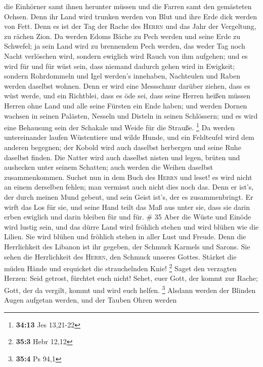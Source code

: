 die Einhörner samt ihnen herunter müssen und die Farren samt den
gemästeten Ochsen. Denn ihr Land wird trunken werden von Blut und ihre
Erde dick werden von Fett.  Denn es ist der Tag der Rache
des \textsc{Herrn} und das Jahr der Vergeltung, zu rächen Zion.
 Da werden Edoms Bäche zu Pech werden und seine Erde zu
Schwefel; ja sein Land wird zu brennendem Pech werden, 
das weder Tag noch Nacht verlöschen wird, sondern ewiglich wird Rauch
von ihm aufgehen; und es wird für und für wüst sein, dass niemand
dadurch gehen wird in Ewigkeit;  sondern Rohrdommeln und
Igel werden's innehaben, Nachteulen und Raben werden daselbst wohnen.
Denn er wird eine Messschnur darüber ziehen, dass es wüst werde, und ein
Richtblei, dass es öde sei,  dass seine Herren heißen
müssen Herren ohne Land und alle seine Fürsten ein Ende haben;
 und werden Dornen wachsen in seinen Palästen, Nesseln
und Disteln in seinen Schlössern; und es wird eine Behausung sein der
Schakale und Weide für die Strauße. \footnote{\textbf{34:13} Jes
  13,21-22}  Da werden untereinander laufen Wüstentiere
und wilde Hunde, und ein Feldteufel wird dem anderen begegnen; der
Kobold wird auch daselbst herbergen und seine Ruhe daselbst finden.
 Die Natter wird auch daselbst nisten und legen, brüten
und aushecken unter seinem Schatten; auch werden die Weihen daselbst
zusammenkommen.  Suchet nun in dem Buch des
\textsc{Herrn} und leset! es wird nicht an einem derselben fehlen; man
vermisst auch nicht dies noch das. Denn er ist's, der durch meinen Mund
gebeut, und sein Geist ist's, der es zusammenbringt.  Er
wirft das Los für sie, und seine Hand teilt das Maß aus unter sie, dass
sie darin erben ewiglich und darin bleiben für und für. \# 35
 Aber die Wüste und Einöde wird lustig sein, und das dürre
Land wird fröhlich stehen und wird blühen wie die Lilien. 
Sie wird blühen und fröhlich stehen in aller Lust und Freude. Denn die
Herrlichkeit des Libanon ist ihr gegeben, der Schmuck Karmels und
Sarons. Sie sehen die Herrlichkeit des \textsc{Herrn}, den Schmuck
unseres Gottes.  Stärket die müden Hände und erquicket die
strauchelnden Knie! \footnote{\textbf{35:3} Hebr 12,12} 
Saget den verzagten Herzen: Seid getrost, fürchtet euch nicht! Sehet,
euer Gott, der kommt zur Rache; Gott, der da vergilt, kommt und wird
euch helfen. \footnote{\textbf{35:4} Ps 94,1}  Alsdann
werden der Blinden Augen aufgetan werden, und der Tauben Ohren werden
